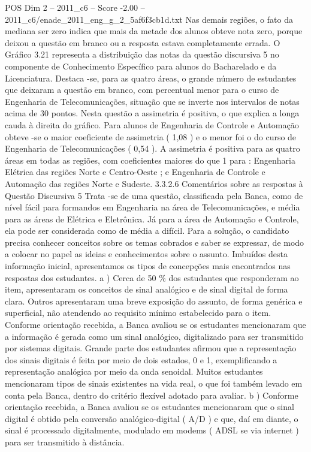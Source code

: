 \begin{textsample}{POS Dim 2 – 2011\_c6 – Score -2.00 – 2011\_c6/enade\_2011\_eng\_g\_2\_5af6f3cb1d.txt}
Nas demais regiões, o fato da mediana ser zero indica que mais da metade dos alunos obteve nota zero, porque deixou a questão em branco ou a resposta estava completamente errada.
O Gráfico 3.21 representa a distribuição das notas da questão discursiva 5 no componente de Conhecimento Específico para alunos do Bacharelado e da Licenciatura.
Destaca -se, para as quatro áreas, o grande número de estudantes que deixaram a questão em branco, com percentual menor para o curso de Engenharia de Telecomunicações, situação que se inverte nos intervalos de notas acima de 30 pontos.
Nesta questão a assimetria é positiva, o que explica a longa cauda à direita do gráfico.
Para alunos de Engenharia de Controle e Automação obteve -se o maior coeficiente de assimetria ( 1,08 ) e o menor foi o do curso de Engenharia de Telecomunicações ( 0,54 ).
A assimetria é positiva para as quatro áreas em todas as regiões, com coeficientes maiores do que 1 para : Engenharia Elétrica das regiões Norte e Centro-Oeste ; e Engenharia de Controle e Automação das regiões Norte e Sudeste. 3.3.2.6 Comentários sobre as respostas à Questão Discursiva 5 Trata -se de uma questão, classificada pela Banca, como de nível fácil para formandos em Engenharia na área de Telecomunicações, e média para as áreas de Elétrica e Eletrônica.
Já para a área de Automação e Controle, ela pode ser considerada como de média a difícil.
Para a solução, o candidato precisa conhecer conceitos sobre os temas cobrados e saber se expressar, de modo a colocar no papel as ideias e conhecimentos sobre o assunto.
Imbuídos desta informação inicial, apresentamos os tipos de concepções mais encontrados nas respostas dos estudantes. a ) Cerca de 50 \% dos estudantes que responderam ao item, apresentaram os conceitos de sinal analógico e de sinal digital de forma clara.
Outros apresentaram uma breve exposição do assunto, de forma genérica e superficial, não atendendo ao requisito mínimo estabelecido para o item.
Conforme orientação recebida, a Banca avaliou se os estudantes mencionaram que a informação é gerada como um sinal analógico, digitalizado para ser transmitido por sistemas digitais.
Grande parte dos estudantes afirmou que a representação dos sinais digitais é feita por meio de dois estados, 0 e 1, exemplificando a representação analógica por meio da onda senoidal.
Muitos estudantes mencionaram tipos de sinais existentes na vida real, o que foi também levado em conta pela Banca, dentro do critério flexível adotado para avaliar. b ) Conforme orientação recebida, a Banca avaliou se os estudantes mencionaram que o sinal digital é obtido pela conversão analógico-digital ( A/D ) e que, daí em diante, o sinal é processado digitalmente, modulado em modems ( ADSL se via internet ) para ser transmitido à distância.

\end{textsample}
